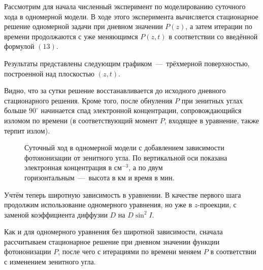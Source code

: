 \documentclass[14pt, a4paper, fleqn]{extarticle}
\begin{document}
Рассмотрим для начала численный эксперимент по моделированию суточного хода в одномерной модели. В ходе этого эксперимента вычисляется стационарное решение одномерной задачи при дневном значении $P(z)$, а затем итерации по времени продолжаются с уже меняющимся $P(z, t)$ в соответствии со введённой формулой $(13)$.

Результаты представлены следующим графиком~---~трёхмерной поверхностью, построенной над плоскостью $(z, t)$.

Видно, что за сутки решение восстанавливается до исходного дневного стационарного решения. Кроме того, после обнуления $P$ при зенитных углах больше $90^\circ$ начинается спад электронной концентрации, сопровождающийся изломом по времени (в соответствующий момент $P$, входящее в уравнение, также терпит излом).


\begin{figure}[H]
\caption{Суточный ход в одномерной модели с добавлением зависимости фотоионизации от зенитного угла. По вертикальной оси показана электронная концентрация в см$^{-3}$, а по двум горизонтальным~---~высота в км и время в мин.}
\end{figure}


Учтём теперь широтную зависимость в уравнении. В качестве первого шага продолжим использование одномерного уравнения, но уже в $z$-проекции, с заменой коэффициента диффузии $D$ на $D\sin^2I$.

Как и для одномерного уравнения без широтной зависимости, сначала рассчитываем стационарное решение при дневном значении функции фотоионизации $P$, после чего с итерациями по времени меняем $P$ в соответствии с изменением зенитного угла.
\end{document}
